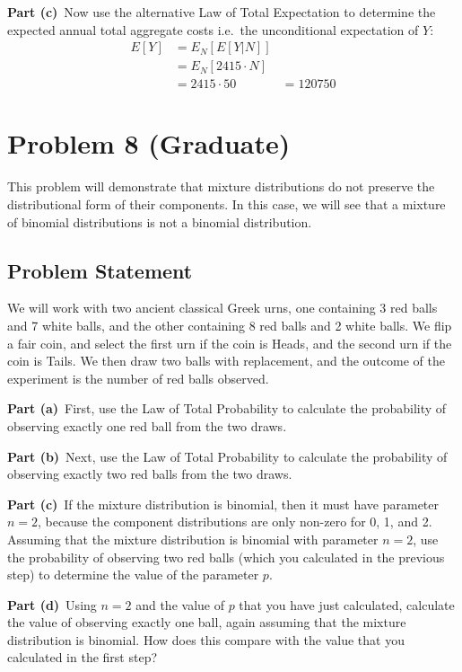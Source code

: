 \documentclass[12pt]{article}
\theoremstyle{definition}
\begin{document}
\noindent
{\bf Part (c)}\ Now use the alternative Law of Total Expectation to determine the expected annual total aggregate costs i.e.\ the unconditional expectation of $Y$:
\begin{align*}
E[Y] &= E_N[E[Y|N]]\\
&= E_N[2415\cdot N]\\
&= 2415\cdot 50
&= 120750
\end{align*}

\newpage
\section*{Problem 8 (Graduate)}

This problem will demonstrate that mixture distributions do not preserve the distributional form of their components. In this case, we will see that a mixture of binomial distributions is not a binomial distribution.

\subsection*{Problem Statement}

We will work with two ancient classical Greek urns, one containing 3 red balls and 7 white balls, and the other containing 8 red balls and 2 white balls. We flip a fair coin, and select the first urn if the coin is Heads, and the second urn if the coin is Tails. We then draw two balls with replacement, and the outcome of the experiment is the number of red balls observed.

\bigskip
\noindent
{\bf Part (a)}\ First, use the Law of Total Probability to calculate the probability of observing exactly one red ball from the two draws.

\bigskip
\noindent
{\bf Part (b)}\ Next, use the Law of Total Probability to calculate the probability of observing exactly two red balls from the two draws.

\bigskip
\noindent
{\bf Part (c)}\ If the mixture distribution is binomial, then it must have parameter $n = 2$, because the component distributions are only non-zero for 0, 1, and 2. Assuming that the  mixture distribution is binomial with parameter $n = 2$, use the probability of observing two red balls (which you calculated in the previous step) to determine the value of the parameter $p$.

\bigskip
\noindent
{\bf Part (d)}\ Using $n = 2$ and the value of $p$ that you have just calculated, calculate the value of observing exactly one ball, again assuming that the mixture distribution is binomial. How does this compare with the value that you calculated in the first step?
\end{document}
